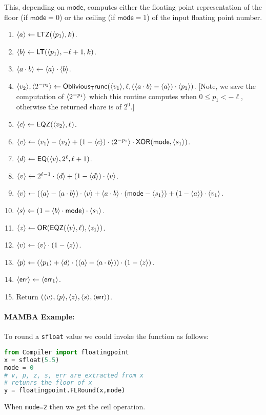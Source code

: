 This, depending on $\mathsf{mode}$, computes either the floating point
representation of the floor (if $\mathsf{mode}=0$) or the ceiling (if $\mathsf{mode}=1$)
of the input floating point number.
\begin{enumerate}
\item $\langle a \rangle \leftarrow \mathsf{LTZ}(\langle p_1 \rangle,k)$.
\item $\langle b \rangle \leftarrow \mathsf{LT}(\langle p_1 \rangle,-\ell+1,k)$.
\item $\langle a \cdot b \rangle \leftarrow \langle a \rangle \cdot \langle b \rangle$.
\item $\langle v_2 \rangle,\langle 2^{-p_1} \rangle \leftarrow \mathsf{Oblivious_Trunc}(\langle v_1 \rangle,\ell,(\langle a \cdot b \rangle-\langle a \rangle) \cdot \langle p_1 \rangle)$. 
	[Note, we save the computation of $\langle 2^{-p_1} \rangle$ which this routine computes when $0 \le p_1 < -\ell$, otherwise the returned share is of $2^0$.]
\item $\langle c \rangle \leftarrow \mathsf{EQZ}(\langle v_2 \rangle,\ell)$.
\item $\langle v \rangle \leftarrow \langle v_1 \rangle-\langle v_2 \rangle+(1-\langle c \rangle) \cdot \langle 2^{-p_1} \rangle 
	\cdot \mathsf{XOR}(\mathsf{mode},\langle s_1 \rangle)$.
\item $\langle d \rangle \leftarrow \mathsf{EQ}(\langle v \rangle,2^\ell,\ell+1)$.
\item $\langle v \rangle \leftarrow 2^{\ell-1} \cdot \langle d \rangle + (1-\langle d \rangle) \cdot \langle v \rangle$.
\item $\langle v \rangle \leftarrow (\langle a \rangle-\langle a \cdot b \rangle) \cdot \langle v \rangle
			+ \langle a \cdot b \rangle \cdot (\mathsf{mode}-\langle s_1 \rangle)
					+ (1-\langle a \rangle) \cdot \langle v_1 \rangle$.
\item $\langle s \rangle \leftarrow (1-\langle b \rangle \cdot \mathsf{mode}) \cdot \langle s_1 \rangle$.
\item $\langle z \rangle \leftarrow \mathsf{OR}(\mathsf{EQZ}(\langle v \rangle,\ell),\langle z_1 \rangle)$.
\item $\langle v \rangle \leftarrow \langle v \rangle \cdot (1-\langle z \rangle)$.
\item $\langle p \rangle \leftarrow (\langle p_1 \rangle+\langle d \rangle \cdot (\langle a \rangle-\langle a \cdot b \rangle)) \cdot (1-\langle z \rangle)$.
\item $\langle \mathsf{err} \rangle \leftarrow \langle \mathsf{err}_1 \rangle$.
\item Return $(\langle v \rangle,\langle p \rangle,\langle z \rangle,\langle s \rangle,\langle \mathsf{err} \rangle)$.
\end{enumerate}

\paragraph{MAMBA Example:} To round a \verb|sfloat| value we could invoke the function as follows: 
\begin{lstlisting}[language={python}]
from Compiler import floatingpoint
x = sfloat(5.5)
mode = 0 
# v, p, z, s, err are extracted from x
# retunrs the floor of x
y = floatingpoint.FLRound(x,mode)
\end{lstlisting}
When \verb+mode=2+ then we get the ceil operation.


